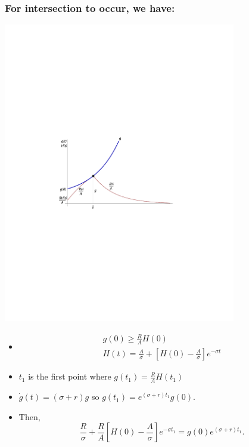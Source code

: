 \documentclass[12pt,compress,handout]{beamer}  %
\begin{document}
\begin{frame}
\frametitle{For intersection to occur, we have:}
\begin{center}
\includegraphics[width=4in]{include/fig-shesh-for-intersection}
\end{center}
\end{frame}


\begin{frame}
\begin{itemize}[<+->]
\item
  \begin{gather*}
    g(0) \geq \frac{R}{A} H(0) \\
    H(t) = \frac{A}{\sigma} + \left[ H(0) - \frac{A}{\sigma} \right]
    e^{-\sigma t}
  \end{gather*}

\item $t_{1}$ is the first point where $g(t_{1}) = \frac{R}{A} H(t_{1})$

\item $\dot{g}(t) = (\sigma + r)g$ so $g(t_{1}) = e^{(\sigma +
    r)t_{1}}g(0)$.

\item Then,
  \begin{equation*}
    \frac{R}{\sigma} + \frac{R}{A} \left[ H(0) - \frac{A}{\sigma}
    \right] e^{-\sigma t_{1}} = g(0)e^{(\sigma + r)t_{1}}.
  \end{equation*}
\end{itemize}
\end{frame}
\end{document}

